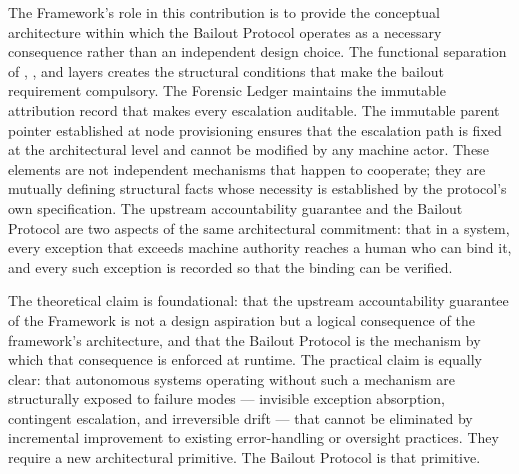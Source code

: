 The \bxthree{} Framework's role in this contribution is to provide the conceptual architecture within which the Bailout Protocol operates as a necessary consequence rather than an independent design choice. The functional separation of \purpose{}, \bounds{}, and \fact{} layers creates the structural conditions that make the bailout requirement compulsory. The Forensic Ledger maintains the immutable attribution record that makes every escalation auditable. The immutable parent pointer established at node provisioning ensures that the escalation path is fixed at the architectural level and cannot be modified by any machine actor. These elements are not independent mechanisms that happen to cooperate; they are mutually defining structural facts whose necessity is established by the protocol's own specification. The upstream accountability guarantee and the Bailout Protocol are two aspects of the same architectural commitment: that in a \bxthree{} system, every exception that exceeds machine authority reaches a human who can bind it, and every such exception is recorded so that the binding can be verified.

The theoretical claim is foundational: that the upstream accountability guarantee of the \bxthree{} Framework is not a design aspiration but a logical consequence of the framework's architecture, and that the Bailout Protocol is the mechanism by which that consequence is enforced at runtime. The practical claim is equally clear: that autonomous systems operating without such a mechanism are structurally exposed to failure modes — invisible exception absorption, contingent escalation, and irreversible drift — that cannot be eliminated by incremental improvement to existing error-handling or oversight practices. They require a new architectural primitive. The Bailout Protocol is that primitive.